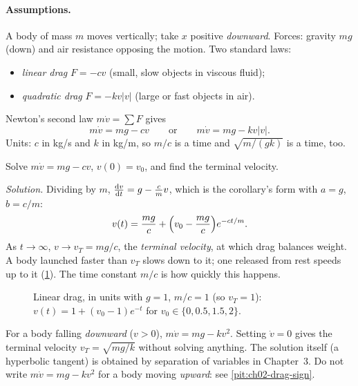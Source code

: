 \paragraph{Assumptions.} A body of mass $m$ moves vertically; take $x$ positive
\emph{downward}. Forces: gravity $mg$ (down) and air resistance opposing the
motion. Two standard laws:
\begin{itemize}
  \item \emph{linear drag} $F = -cv$ (small, slow objects in viscous fluid);
  \item \emph{quadratic drag} $F = -kv|v|$ (large or fast objects in air).
\end{itemize}
Newton's second law $m\dot v = \sum F$ gives
\begin{equation}\label{eq:ch02-drag}
  m\dot{v} = mg - cv
  \qquad\text{or}\qquad
  m\dot{v} = mg - kv|v| .
\end{equation}
Units: $c$ in kg/s and $k$ in kg/m, so $m/c$ is a time and $\sqrt{m/(gk)}$ is
a time, too.

\begin{example}\label{ex:ch02-linear-drag}
Solve $m\dot v = mg - cv$, $v(0) = v_0$, and find the terminal velocity.

\emph{Solution.}  Dividing by $m$, $\frac{\mathrm{d}v}{\mathrm{d}t} = g - \frac cm v$, which
is the corollary's form with $a = g$, $b = c/m$:
\[
  v(t) = \frac{mg}{c} + \Bigl(v_0 - \frac{mg}{c}\Bigr)e^{-ct/m}.
\]
As $t\to\infty$, $v\to v_T = mg/c$, the \emph{terminal velocity}, at which drag
balances weight. A body launched faster than $v_T$ slows down to it; one
released from rest speeds up to it (\cref{fig:ch02-drag}). The time
constant $m/c$ is how quickly this happens.
\end{example}

\begin{figure}[ht]
  \centering
  
  \caption{Linear drag, in units with $g = 1$, $m/c = 1$ (so $v_T = 1$):
  $v(t) = 1 + (v_0 - 1)e^{-t}$ for $v_0\in\{0, 0.5, 1.5, 2\}$.}
  \label{fig:ch02-drag}
\end{figure}

\begin{example}\label{ex:ch02-quadratic}
For a body falling \emph{downward} ($v>0$), $m\dot v = mg - kv^2$. Setting
$\dot v = 0$ gives the terminal velocity $v_T = \sqrt{mg/k}$ without solving
anything. The solution itself (a hyperbolic tangent) is obtained by separation
of variables in Chapter~3. Do not write $m\dot v = mg - kv^2$ for a body moving
\emph{upward}: see \cref{pit:ch02-drag-sign}.
\end{example}

